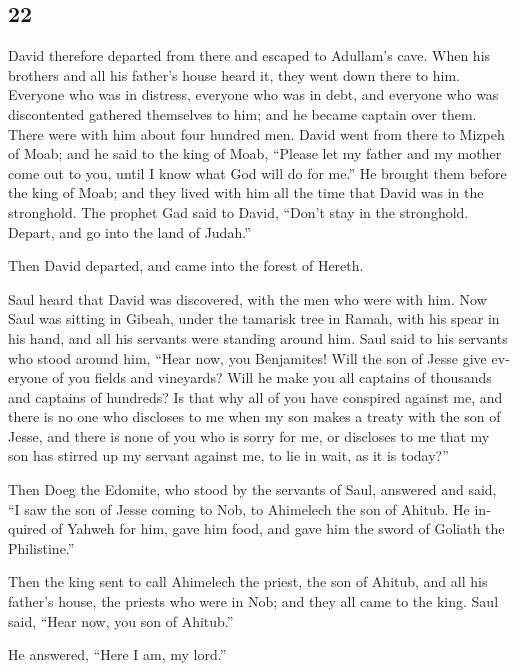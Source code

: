 \begin{paracol}{2}
\begin{otherlanguage}{english}
{\section{22}\label{section-43}}

 David therefore departed from there and escaped to
Adullam's cave. When his brothers and all his father's house heard it,
they went down there to him.  Everyone who was in
distress, everyone who was in debt, and everyone who was discontented
gathered themselves to him; and he became captain over them. There were
with him about four hundred men.  David went from there to
Mizpeh of Moab; and he said to the king of Moab, ``Please let my father
and my mother come out to you, until I know what God will do for me.''
 He brought them before the king of Moab; and they lived
with him all the time that David was in the stronghold. 
The prophet Gad said to David, ``Don't stay in the stronghold. Depart,
and go into the land of Judah.''

Then David departed, and came into the forest of Hereth.

 Saul heard that David was discovered, with the men who
were with him. Now Saul was sitting in Gibeah, under the tamarisk tree
in Ramah, with his spear in his hand, and all his servants were standing
around him.  Saul said to his servants who stood around
him, ``Hear now, you Benjamites! Will the son of Jesse give everyone of
you fields and vineyards? Will he make you all captains of thousands and
captains of hundreds?  Is that why all of you have
conspired against me, and there is no one who discloses to me when my
son makes a treaty with the son of Jesse, and there is none of you who
is sorry for me, or discloses to me that my son has stirred up my
servant against me, to lie in wait, as it is today?''

 Then Doeg the Edomite, who stood by the servants of Saul,
answered and said, ``I saw the son of Jesse coming to Nob, to Ahimelech
the son of Ahitub.  He inquired of Yahweh for him, gave
him food, and gave him the sword of Goliath the Philistine.''

 Then the king sent to call Ahimelech the priest, the son
of Ahitub, and all his father's house, the priests who were in Nob; and
they all came to the king.  Saul said, ``Hear now, you
son of Ahitub.''

He answered, ``Here I am, my lord.''


\end{otherlanguage}
\end{paracol}
